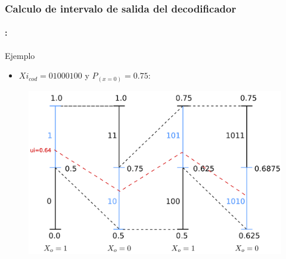 \begin{frame}
  \frametitle{\textbf{Calculo de intervalo de salida del  decodificador}}
\framesubtitle{\secname : \subsecname}
   \begin{block}{Ejemplo}
   \begin{itemize}
    \item $Xi_{cod} = 01000100$ y  $P_{(x=0)}=0.75$:
  \end{itemize}
  \end{block}
      \vspace{-0.3cm}
  \begin{figure}[!t] \centering
  \includegraphics[width=0.70\paperwidth]{Diagramas/int_sal_dec.png}%
  \end{figure}
\end{frame}



